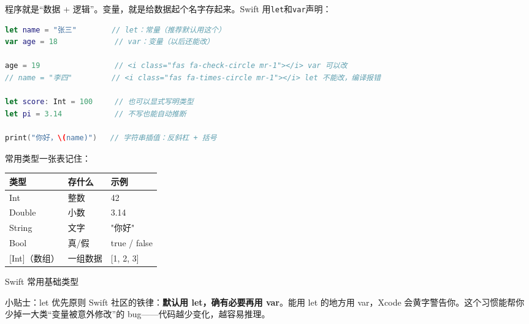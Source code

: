 


程序就是“数据 + 逻辑”。变量，就是给数据起个名字存起来。Swift 用\texttt{let}和\texttt{var}声明：

\begin{lstlisting}[language=Swift]
let name = "张三"        // let：常量（推荐默认用这个）
var age = 18             // var：变量（以后还能改）

age = 19                 // <i class="fas fa-check-circle mr-1"></i> var 可以改
// name = "李四"         // <i class="fas fa-times-circle mr-1"></i> let 不能改，编译报错

let score: Int = 100     // 也可以显式写明类型
let pi = 3.14            // 不写也能自动推断

print("你好，\(name)")   // 字符串插值：反斜杠 + 括号
\end{lstlisting}

常用类型一张表记住：

\begin{center}
\begin{tabularx}{\linewidth}{|X|X|X|}
\hline
\textbf{类型} & \textbf{存什么} & \textbf{示例} \tabularnewline
\hline
Int & 整数 & 42 \tabularnewline
Double & 小数 & 3.14 \tabularnewline
String & 文字 & "你好" \tabularnewline
Bool & 真/假 & true / false \tabularnewline
{}[Int]（数组） & 一组数据 & {}[1, 2, 3] \tabularnewline
\hline
\end{tabularx}
\end{center}

\begin{center}\small\color{gray}Swift 常用基础类型\end{center}

\begin{tcbinfo}{小贴士：let 优先原则}
Swift 社区的铁律：\textbf{默认用 let，确有必要再用 var}。能用 let 的地方用 var，Xcode 会黄字警告你。这个习惯能帮你少掉一大类“变量被意外修改”的 bug——代码越少变化，越容易推理。

\end{tcbinfo}



